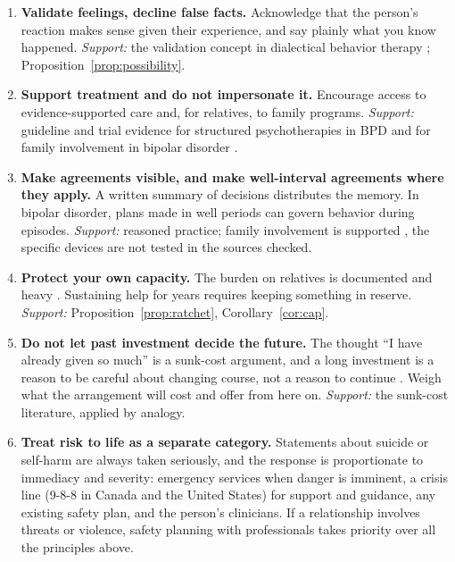 \documentclass[11pt]{article}
\theoremstyle{definition}
\theoremstyle{remark}
\begin{document}
\begin{enumerate}[itemsep=0.35em]
\item \textbf{Validate feelings, decline false facts.} Acknowledge that the person's reaction makes sense given their experience, and say plainly what you know happened. \emph{Support:} the validation concept in dialectical behavior therapy \citep{linehan1993}; Proposition~\ref{prop:possibility}.
\item \textbf{Support treatment and do not impersonate it.} Encourage access to evidence-supported care and, for relatives, to family programs. \emph{Support:} guideline and trial evidence for structured psychotherapies in BPD \citep{apa2024,storebo2020} and for family involvement in bipolar disorder \citep{miklowitz2003}.
\item \textbf{Make agreements visible, and make well-interval agreements where they apply.} A written summary of decisions distributes the memory. In bipolar disorder, plans made in well periods can govern behavior during episodes. \emph{Support:} reasoned practice; family involvement is supported \citep{miklowitz2003}, the specific devices are not tested in the sources checked.
\item \textbf{Protect your own capacity.} The burden on relatives is documented and heavy \citep{bailey2013}. Sustaining help for years requires keeping something in reserve. \emph{Support:} Proposition~\ref{prop:ratchet}, Corollary~\ref{cor:cap}.
\item \textbf{Do not let past investment decide the future.} The thought ``I have already given so much'' is a sunk-cost argument, and a long investment is a reason to be careful about changing course, not a reason to continue \citep{arkes1985}. Weigh what the arrangement will cost and offer from here on. \emph{Support:} the sunk-cost literature, applied by analogy.
\item \textbf{Treat risk to life as a separate category.} Statements about suicide or self-harm are always taken seriously, and the response is proportionate to immediacy and severity: emergency services when danger is imminent, a crisis line (9-8-8 in Canada and the United States) for support and guidance, any existing safety plan, and the person's clinicians. If a relationship involves threats or violence, safety planning with professionals takes priority over all the principles above.
\end{enumerate}
\end{document}
